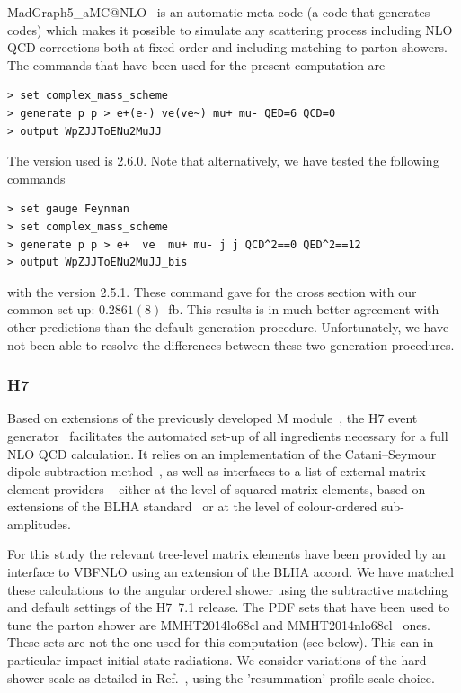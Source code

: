 \documentclass[11pt]{cernrep}
\newcommand{\Herwig}{H\protect\scalebox{0.8}{ERWIG}7\xspace}
\newcommand{\Matchbox}{M\protect\scalebox{0.8}{ATCHBOX}\xspace}
\begin{document}
{\sc MadGraph5\_aMC@NLO}~\cite{Alwall:2014hca} is an automatic meta-code (a code that generates codes) which makes it possible to simulate any scattering process
      including NLO QCD corrections both at fixed order and including matching to parton showers. 
      The commands that have been used for the present computation are
\begin{verbatim}
> set complex_mass_scheme
> generate p p > e+(e-) ve(ve~) mu+ mu- QED=6 QCD=0
> output WpZJJToENu2MuJJ
\end{verbatim}
  The version used is 2.6.0.
  Note that alternatively, we have tested the following commands
  \begin{verbatim}
> set gauge Feynman
> set complex_mass_scheme
> generate p p > e+  ve  mu+ mu- j j QCD^2==0 QED^2==12
> output WpZJJToENu2MuJJ_bis
\end{verbatim}
  with the version 2.5.1.
  These command gave for the cross section with our common set-up: $0.2861(8)$~fb.
  This results is in much better agreement with other predictions than the default generation procedure.
  Unfortunately, we have not been able to resolve the differences between these two generation procedures.
  
\subsubsection*{\protect\Herwig \label{vbs_herwig}}

Based on extensions of the previously developed \Matchbox
module~\cite{Platzer:2011bc}, the \Herwig event generator~\cite{Bellm:2015jjp,Bahr:2008pv} facilitates the automated set-up of all ingredients necessary for a full NLO QCD calculation.
It relies on an implementation of the Catani--Seymour dipole
subtraction method~\cite{Catani:1996vz,Catani:2002hc}, as well as
interfaces to a list of external matrix element providers -- either
at the level of squared matrix elements, based on extensions of the
BLHA standard~\cite{Binoth:2010xt,Alioli:2013nda,Andersen:2014efa} or
at the level of colour-ordered sub-amplitudes.

For this study the relevant tree-level matrix elements have been
provided by an interface to VBFNLO \cite{Arnold:2008rz,Arnold:2011wj,Baglio:2014uba} using an extension of the BLHA
accord. We have matched these calculations to the angular ordered
shower using the subtractive matching and default settings of the
\Herwig~7.1 release. The PDF sets that have been used to tune the parton shower are MMHT2014lo68cl and
MMHT2014nlo68cl~\cite{Harland-Lang:2014zoa} ones.
These sets are not the one used for this computation (see below).
This can in particular impact initial-state radiations.
We consider variations of the hard shower scale as detailed in Ref.~\cite{Bellm:2016rhh}, using the 'resummation' profile scale choice.
\end{document}

